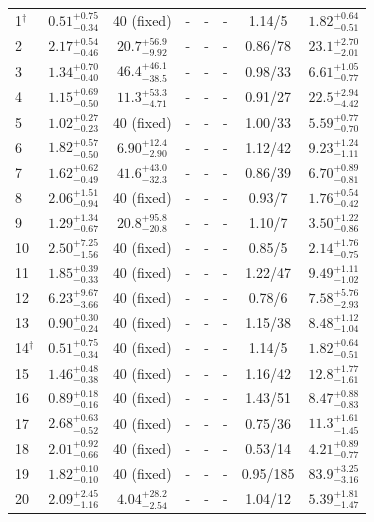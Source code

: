 \documentclass[fleqn,usenatbib]{mnras}
\begin{document}
\begin{table}
\begin{threeparttable}
\begin{spacing}{1.19}
\begin{tabular}{lccccccc}
1$^\dag$ & $0.51^{+0.75}_{-0.34}$ & 40 (fixed)  &-&-&-& 1.14/5  & $1.82^{+0.64}_{-0.51}$
\\
2 & $2.17^{+0.54}_{-0.46}$ & $20.7^{+56.9}_{-9.92}$ &-&-&-& 0.86/78  & $23.1^{+2.70}_{-2.01}$
\\
3 & $1.34^{+0.70}_{-0.40}$ & $46.4^{+46.1}_{-38.5}$ &-&-&-& 0.98/33  & $6.61^{+1.05}_{-0.77}$
\\
4 & $1.15^{+0.69}_{-0.50}$ & $11.3^{+53.3}_{-4.71}$ &-&-&-& 0.91/27  & $22.5^{+2.94}_{-4.42}$
\\
5 & $1.02^{+0.27}_{-0.23}$ & 40 (fixed) &-&-&-& 1.00/33 &  $5.59^{+0.77}_{-0.70}$
\\
6 & $1.82^{+0.57}_{-0.50}$ & $6.90^{+12.4}_{-2.90}$ 
	&-&-&-& 1.12/42 &  $9.23^{+1.24}_{-1.11}$
\\
7 & $1.62^{+0.62}_{-0.49}$ & $41.6^{+43.0}_{-32.3}$ &-&-&-& 0.86/39 &  $6.70^{+0.89}_{-0.81}$
\\
8 & $2.06^{+1.51}_{-0.94}$ & 40 (fixed) &-&-&-& 0.93/7 &  $1.76^{+0.54}_{-0.42}$
\\
9 & $1.29^{+1.34}_{-0.67}$ & $20.8^{+95.8}_{-20.8}$ &-&-&-& 1.10/7 &  $3.50^{+1.22}_{-0.86}$
\\
10 & $2.50^{+7.25}_{-1.56}$ & 40 (fixed)  &-&-&-& 0.85/5 &  $2.14^{+1.76}_{-0.75}$
\\
11 & $1.85^{+0.39}_{-0.33}$ & 40 (fixed)  &-&-&-& 1.22/47 &  $9.49^{+1.11}_{-1.02}$
\\
12 & $6.23^{+9.67}_{-3.66}$ & 40 (fixed) &-&-&-& 0.78/6 &  $7.58^{+5.76}_{-2.93}$
\\
13 & $0.90^{+0.30}_{-0.24}$ & 40 (fixed) &-&-&-& 1.15/38 &  $8.48^{+1.12}_{-1.04}$
\\
14$^\dag$ & $0.51^{+0.75}_{-0.34}$ & 40 (fixed) &-&-&-&  1.14/5 &  $1.82^{+0.64}_{-0.51}$
\\
15 & $1.46^{+0.48}_{-0.38}$ & 40 (fixed) &-&-&-&  1.16/42 & $12.8^{+1.77}_{-1.61}$
\\
16 & $0.89^{+0.18}_{-0.16}$ & 40 (fixed) &-&-&-&  1.43/51  & $8.47^{+0.88}_{-0.83}$
\\
17 & $2.68^{+0.63}_{-0.52}$ & 40 (fixed)  &-&-&-&  0.75/36 & $11.3^{+1.61}_{-1.45}$
\\
18 & $2.01^{+0.92}_{-0.66}$ & 40 (fixed)  &-&-&-&  0.53/14  & $4.21^{+0.89}_{-0.77}$
\\
19 & $1.82^{+0.10}_{-0.10}$ & 40 (fixed)  &-&-&-& 0.95/185  & $83.9^{+3.25}_{-3.16}$
\\
20 & $2.09^{+2.45}_{-1.16}$ & $4.04^{+28.2}_{-2.54}$ &-&-&-& 1.04/12  & $5.39^{+1.81}_{-1.47}$
\\

\end{tabular}
\end{spacing}
\end{threeparttable}
\end{table}
\end{document}

